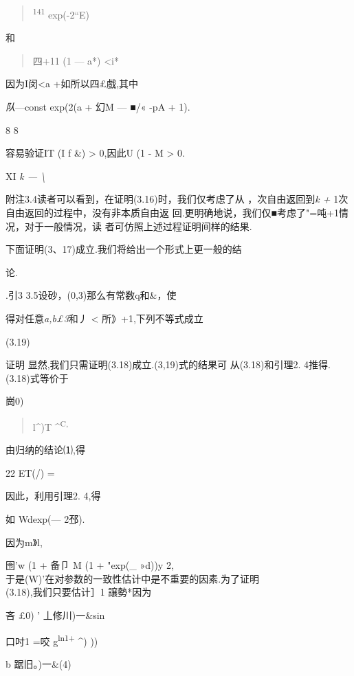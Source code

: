 \begin{quote}
\textsuperscript{141} exp(-2``E)
\end{quote}

和

\begin{quote}
\textbar{}四+11 (1 --- a*) \textbar{}\textless{}i*
\end{quote}

因为I闵\textless{}a +如所以四£戲,其中

\emph{队}---const exp(2(a + 幻M --- ■/« -pA + 1).

8 8

容易验证IT (I f \&) \textgreater{} 0,因此U (1 - M \textgreater{} 0.

XI \emph{k --- \textbackslash{}}

附注3.4读者可以看到，在证明(3.16)时，我们仅考虑了从
，次自由返回到\emph{k +} 1次自由返回的过程中，没有非本质自由返
回.更明确地说，我们仅■考虑了"=吨+1情况，对于一般情况，读
者可仿照上述过程证明间样的结果.

下面证明(3、17)成立.我们将给出一个形式上更一般的结

论.

.引3 3.5设砂，(0,3)那么有常数q和\&，使

得对任意\emph{a,b£3}和丿 \textless{} 所》+1,下列不等式成立

(3.19)

证明 显然,我们只需证明(3.18)成立.(3,19)式的结果可 从(3.18)和引理2.
4推得.(3.18)式等价于

崗0)\textbar{}

\begin{quote}
l\^{})T \^{}\textsuperscript{C,}
\end{quote}

由归纳的结论⑴,得

22 \textbar{}ET(/)\textbar{} =

因此，利用引理2. 4,得

\textbar{}如 Wdexp(--- 2邳).

因为m》l,

囹'w (1 + 备卩 M (1 + "exp(\_ »d))y 2,\\
于是(W)'在对参数的一致性估计中是不重要的因素.为了证明\\
(3.18),我们只要估计］1 譲勢*因为

吝 \textbar{}£0)\textbar{} ' 丄修川)一\&sin

口吋1 =咬 g\textsuperscript{ln}\textbar{}\textsuperscript{1+}
\textbar{}\^{})\textbar{} ))

b 踞旧。)一\&(4)\textbar{}

